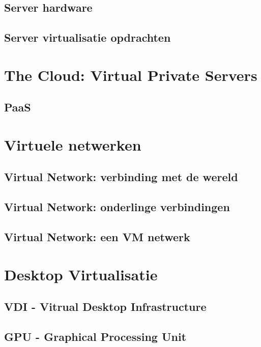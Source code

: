 \documentclass[a4paper,12pt,twoside,openright,titlepage]{book}
\begin{document}
\subsection{Server hardware}

\subsection{Server virtualisatie opdrachten}

\section{The Cloud: Virtual Private Servers}

\subsection{PaaS}

\section{Virtuele netwerken}

\subsection{Virtual Network: verbinding met de wereld}

\subsection{Virtual Network: onderlinge verbindingen}

\subsection{Virtual Network: een VM netwerk}

\section{Desktop Virtualisatie}

\subsection{VDI - Vitrual Desktop Infrastructure}

\subsection{GPU - Graphical Processing Unit}

\end{document}
